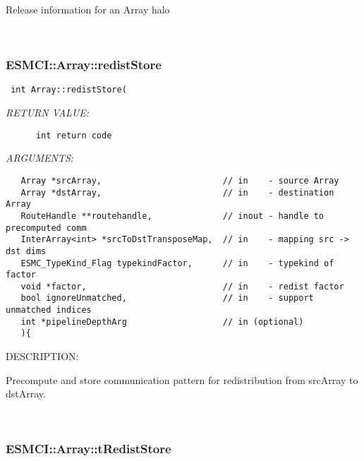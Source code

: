       Release information for an Array halo
   
 
\mbox{}\hrulefill\
 
\subsubsection [ESMCI::Array::redistStore] {ESMCI::Array::redistStore}


  
\begin{verbatim} int Array::redistStore(\end{verbatim}{\em RETURN VALUE:}
\begin{verbatim}      int return code\end{verbatim}{\em ARGUMENTS:}
\begin{verbatim}   Array *srcArray,                        // in    - source Array
   Array *dstArray,                        // in    - destination Array
   RouteHandle **routehandle,              // inout - handle to precomputed comm
   InterArray<int> *srcToDstTransposeMap,  // in    - mapping src -> dst dims
   ESMC_TypeKind_Flag typekindFactor,      // in    - typekind of factor
   void *factor,                           // in    - redist factor
   bool ignoreUnmatched,                   // in    - support unmatched indices
   int *pipelineDepthArg                   // in (optional)
   ){\end{verbatim}
{\sf DESCRIPTION:\\ }


    Precompute and store communication pattern for redistribution
    from srcArray to dstArray.
   
 
\mbox{}\hrulefill\
 
\subsubsection [ESMCI::Array::tRedistStore] {ESMCI::Array::tRedistStore}


